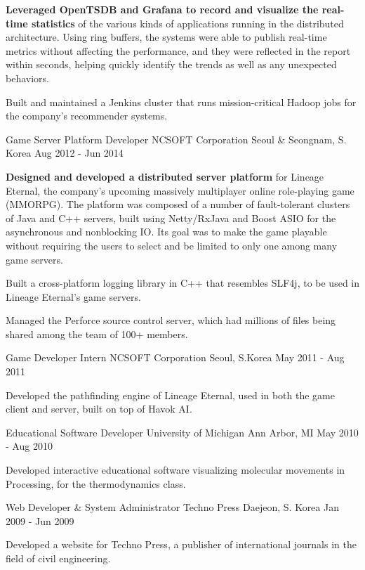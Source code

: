 \documentclass[12pt, a4paper]{awesome-cv}
\begin{document}
\begin{cventries}
{\begin{cvitems}
				\item \textbf{Leveraged OpenTSDB and Grafana to record and visualize the real-time statistics} of the various kinds of applications running in the distributed architecture. Using ring buffers, the systems were able to publish real-time metrics without affecting the performance, and they were reflected in the report within seconds, helping quickly identify the trends as well as any unexpected behaviors.
				\item Built and maintained a Jenkins cluster that runs mission-critical Hadoop jobs for the company's recommender systems.
			\end{cvitems}
		}
		\cventry
		{Game Server Platform Developer}
		{NCSOFT Corporation}
		{Seoul \& Seongnam, S. Korea}
		{Aug 2012 - Jun 2014}
		{
			\begin{cvitems}
				\item \textbf{Designed and developed a distributed server platform} for Lineage Eternal, the company's upcoming massively multiplayer online role-playing game (MMORPG).
				The platform was composed of a number of fault-tolerant clusters of Java and C++ servers, built using Netty/RxJava and Boost ASIO for the asynchronous and nonblocking IO.
				Its goal was to make the game playable without requiring the users to select and be limited to only one among many game servers.
				\item Built a cross-platform logging library in C++ that resembles SLF4j, to be used in Lineage Eternal's game servers.
				\item Managed the Perforce source control server, which had millions of files being shared among the team of 100+ members.
			\end{cvitems}
		}
		\cventry
		{Game Developer Intern}
		{NCSOFT Corporation}
		{Seoul, S.Korea}
		{May 2011 - Aug 2011}
		{
			\begin{cvitems}
				\item Developed the pathfinding engine of Lineage Eternal, used in both the game client and server, built on top of Havok AI.
			\end{cvitems} 
		}
		\cventry
		{Educational Software Developer}
		{University of Michigan}
		{Ann Arbor, MI}
		{May 2010 - Aug 2010}
		{
			\begin{cvitems}
				\item Developed interactive educational software visualizing molecular movements in Processing, for the thermodynamics class.
			\end{cvitems} 
		}
		\cventry
		{Web Developer \& System Administrator}
		{Techno Press}
		{Daejeon, S. Korea}
		{Jan 2009 - Jun 2009}
		{
			\begin{cvitems}
				\item Developed a website for Techno Press, a publisher of international journals in the field of civil engineering.
			\end{cvitems} 
		}
	\end{cventries}
	
\end{document}
